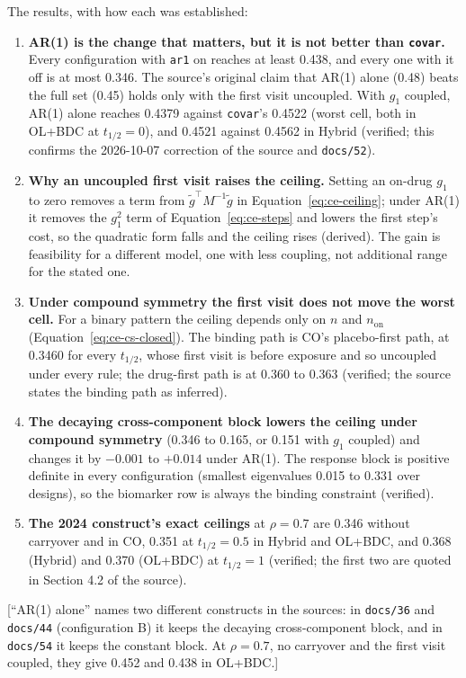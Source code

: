 \documentclass[11pt]{article}
\newcommand{\note}[1]{\textcolor{blue!60!black}{\small [#1]}}
\newcommand{\code}[1]{\texttt{#1}}
\begin{document}
\noindent The results, with how each was established:
\begin{enumerate}[label=(\alph*), itemsep=2pt]
\item \textbf{AR(1) is the change that matters, but it is not better
  than \code{covar}.} Every configuration with \code{ar1} on reaches
  at least 0.438, and every one with it off is at most 0.346. The
  source's original claim that AR(1) alone (0.48) beats the full set
  (0.45) holds only with the first visit uncoupled. With $g_1$
  coupled, AR(1) alone reaches 0.4379 against \code{covar}'s 0.4522
  (worst cell, both in OL+BDC at $t_{1/2} = 0$), and 0.4521 against
  0.4562 in Hybrid (verified; this confirms the 2026-10-07 correction
  of the source and \code{docs/52}).
\item \textbf{Why an uncoupled first visit raises the ceiling.}
  Setting an on-drug $g_1$ to zero removes a term from
  $\tilde g^{\top}M^{-1}\tilde g$ in Equation~\eqref{eq:ce-ceiling};
  under AR(1) it removes the $g_1^2$ term of
  Equation~\eqref{eq:ce-steps} and lowers the first step's cost, so the
  quadratic form falls and the ceiling rises (derived). The gain is
  feasibility for a different model, one with less coupling, not
  additional range for the stated one.
\item \textbf{Under compound symmetry the first visit does not move the
  worst cell.} For a binary pattern the ceiling depends only on $n$
  and $n_{\mathrm{on}}$ (Equation~\eqref{eq:ce-cs-closed}). The binding
  path is CO's placebo-first path, at 0.3460 for every $t_{1/2}$,
  whose first visit is before exposure and so uncoupled under every
  rule; the drug-first path is at 0.360 to 0.363 (verified; the source
  states the binding path as inferred).
\item \textbf{The decaying cross-component block lowers the ceiling
  under compound symmetry} (0.346 to 0.165, or 0.151 with $g_1$
  coupled) and changes it by $-0.001$ to $+0.014$ under AR(1). The
  response block is positive definite in every configuration
  (smallest eigenvalues 0.015 to 0.331 over designs), so the
  biomarker row is always the binding constraint (verified).
\item \textbf{The 2024 construct's exact ceilings} at $\rho = 0.7$ are
  0.346 without carryover and in CO, 0.351 at $t_{1/2} = 0.5$ in Hybrid
  and OL+BDC, and 0.368 (Hybrid) and 0.370 (OL+BDC) at
  $t_{1/2} = 1$ (verified; the first two are quoted in Section 4.2 of
  the source).
\end{enumerate}
\note{``AR(1) alone'' names two different constructs in the sources:
in \code{docs/36} and \code{docs/44} (configuration B) it keeps the
decaying cross-component block, and in \code{docs/54} it keeps
the constant block. At $\rho = 0.7$, no carryover and the first visit
coupled, they give 0.452 and 0.438 in OL+BDC.}
\end{document}
